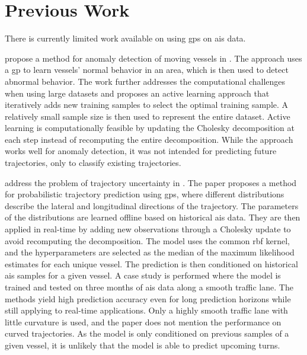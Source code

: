 \chapter{Previous Work}

There is currently limited work available on using \acrshort{gp}s on \acrshort{ais} data.

\citeauthor{gpanomaly} propose a method for anomaly detection of moving vessels in \cite{gpanomaly}. The approach uses a \acrshort{gp} to learn vessels' normal behavior in an area, which is then used to detect abnormal behavior. The work further addresses the computational challenges when using large datasets and proposes an active learning approach that iteratively adds new training samples to select the optimal training sample. A relatively small sample size is then used to represent the entire dataset. Active learning is computationally feasible by updating the Cholesky decomposition at each step instead of recomputing the entire decomposition. While the approach works well for anomaly detection, it was not intended for predicting future trajectories, only to classify existing trajectories.

\citeauthor{gp_ais_trajectory} address the problem of trajectory uncertainty in \cite{gp_ais_trajectory}. The paper proposes a method for probabilistic trajectory prediction using \acrshort{gp}s, where different distributions describe the lateral and longitudinal directions of the trajectory. The parameters of the distributions are learned offline based on historical \acrshort{ais} data. They are then applied in real-time by adding new observations through a Cholesky update to avoid recomputing the decomposition. The model uses the common \acrshort{rbf} kernel, and the hyperparameters are selected as the median of the maximum likelihood estimates for each unique vessel. The prediction is then conditioned on historical \acrshort{ais} samples for a given vessel.
A case study is performed where the model is trained and tested on three months of \acrshort{ais} data along a smooth traffic lane. The methods yield high prediction accuracy even for long prediction horizons while still applying to real-time applications. Only a highly smooth traffic lane with little curvature is used, and the paper does not mention the performance on curved trajectories. As the model is only conditioned on previous samples of a given vessel, it is unlikely that the model is able to predict upcoming turns. 

